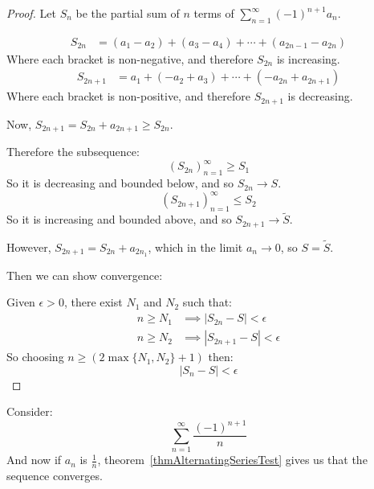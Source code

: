 \documentclass[../Main.tex]{subfiles}
\begin{document}
\begin{proof}
    Let $S_n$ be the partial sum of $n$ terms of $\sum_{n=1}^\infty (-1)^{n+1} a_n$.\par
    \begin{align*}
        S_{2n} &= (a_1 - a_2) + (a_3 - a_4) + \cdots + (a_{2n-1} - a_{2n})
    \end{align*}
    Where each bracket is non-negative, and therefore $S_{2n}$ is increasing.
    \begin{align*}
        S_{2n+1} &= a_1 + (-a_2 + a_3) + \cdots + (-a_{2n} + a_{2n+1})
    \end{align*}
    Where each bracket is non-positive, and therefore $S_{2n+1}$ is decreasing.\par
    Now, $S_{2n+1} = S_{2n} + a_{2n+1} \geq S_{2n}$.\par 
    Therefore the subsequence:
    \begin{equation*}
        (S_{2n})_{n = 1}^\infty \geq S_1
    \end{equation*}
    So it is decreasing and bounded below, and so $S_{2n} \to S$.
    \begin{equation*}
        (S_{2n+1})_{n = 1}^\infty \leq S_2
    \end{equation*}
    So it is increasing and bounded above, and so $S_{2n+1} \to \tilde{S}$.\par
    However, $S_{2n+1} = S_{2n} + a_{2n_1}$, which in the limit $a_n \to 0$, so $S = \tilde{S}$.\par
    Then we can show convergence:\par
    Given $\epsilon > 0$, there exist $N_1$ and $N_2$ such that:
    \begin{align*}
        n \geq N_1 &\implies |S_{2n} - S| < \epsilon \\
        n \geq N_2 &\implies |S_{2n+1} - S| < \epsilon
    \end{align*}
    So choosing $n \geq \left(2\max{\{N_1, N_2\}}+1\right)$ then:
    \begin{equation*}
        |S_{n} - S| < \epsilon
    \end{equation*}
\end{proof}
\begin{example}
    Consider:
    \begin{equation*}
        \sum_{n=1}^\infty \frac{(-1)^{n+1}}{n}
    \end{equation*}
    And now if $a_n$ is $\frac{1}{n}$, theorem~\ref{thmAlternatingSeriesTest} gives us that the sequence converges.
\end{example}
\end{document}
